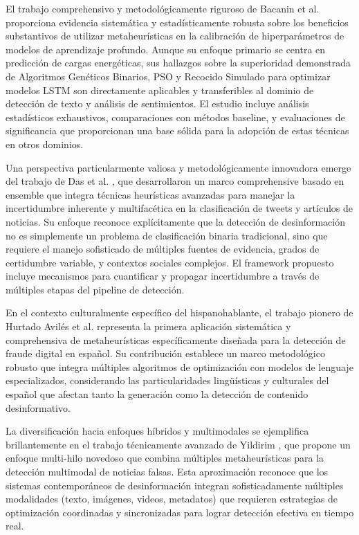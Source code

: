 El trabajo comprehensivo y metodológicamente riguroso de Bacanin et al. \cite{bacanin2023benefits} proporciona evidencia sistemática y estadísticamente robusta sobre los beneficios substantivos de utilizar metaheurísticas en la calibración de hiperparámetros de modelos de aprendizaje profundo. Aunque su enfoque primario se centra en predicción de cargas energéticas, sus hallazgos sobre la superioridad demonstrada de Algoritmos Genéticos Binarios, PSO y Recocido Simulado para optimizar modelos LSTM son directamente aplicables y transferibles al dominio de detección de texto y análisis de sentimientos. El estudio incluye análisis estadísticos exhaustivos, comparaciones con métodos baseline, y evaluaciones de significancia que proporcionan una base sólida para la adopción de estas técnicas en otros dominios.

Una perspectiva particularmente valiosa y metodológicamente innovadora emerge del trabajo de Das et al. \cite{das2022heuristic}, que desarrollaron un marco comprehensive basado en ensemble que integra técnicas heurísticas avanzadas para manejar la incertidumbre inherente y multifacética en la clasificación de tweets y artículos de noticias. Su enfoque reconoce explícitamente que la detección de desinformación no es simplemente un problema de clasificación binaria tradicional, sino que requiere el manejo sofisticado de múltiples fuentes de evidencia, grados de certidumbre variable, y contextos sociales complejos. El framework propuesto incluye mecanismos para cuantificar y propagar incertidumbre a través de múltiples etapas del pipeline de detección.

En el contexto culturalmente específico del hispanohablante, el trabajo pionero de Hurtado Avilés et al. \cite{hurtado2024calibracion} representa la primera aplicación sistemática y comprehensiva de metaheurísticas específicamente diseñada para la detección de fraude digital en español. Su contribución establece un marco metodológico robusto que integra múltiples algoritmos de optimización con modelos de lenguaje especializados, considerando las particularidades lingüísticas y culturales del español que afectan tanto la generación como la detección de contenido desinformativo.

La diversificación hacia enfoques híbridos y multimodales se ejemplifica brillantemente en el trabajo técnicamente avanzado de Yildirim \cite{yildirim2023novel}, que propone un enfoque multi-hilo novedoso que combina múltiples metaheurísticas para la detección multimodal de noticias falsas. Esta aproximación reconoce que los sistemas contemporáneos de desinformación integran sofisticadamente múltiples modalidades (texto, imágenes, videos, metadatos) que requieren estrategias de optimización coordinadas y sincronizadas para lograr detección efectiva en tiempo real.

